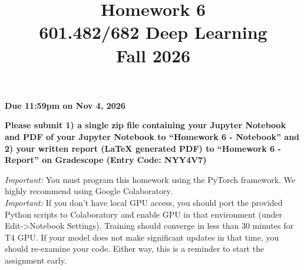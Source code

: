 \documentclass[a4paper]{article}
\title{Homework 6\\
	601.482/682 Deep Learning\\
	Fall 2026}
\begin{document}
	\maketitle

	\begin{center}
		\textbf{Due 11:59pm on Nov 4, 2026}
	\end{center}
	\begin{center}\textbf{Please submit 1) a single zip file containing your Jupyter Notebook and PDF of your Jupyter Notebook to ``Homework 6 - Notebook'' and 2) your written report (LaTeX generated PDF) to ``Homework 6 - Report'' on Gradescope (Entry Code: NYY4V7)}
	\end{center}

	\noindent \emph{Important:} You must program this homework using the PyTorch framework. We highly recommend using Google Colaboratory.\\

	\noindent \emph{Important:} If you don't have local GPU access, you should port the provided Python scripts to Colaboratory and enable GPU in that environment (under Edit->Notebook Settings). Training should converge in less than 30 minutes for T4 GPU. If your model does not make significant updates in that time, you should re-examine your code. Either way, this is a reminder to start the assignment early.
\end{document}

